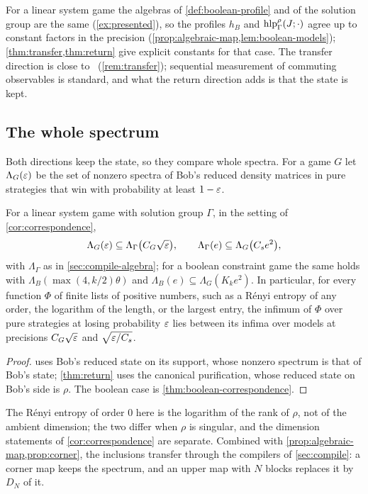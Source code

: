 For a linear system game the algebras of \cref{def:boolean-profile} and of the solution group are the same
(\cref{ex:presented}), so the profiles $h_B$ and $\operatorname{hlp}^\rho_\Gamma(J;\cdot)$ agree up to constant factors in the precision
(\cref{prop:algebraic-map,lem:boolean-models}); \cref{thm:transfer,thm:return} give explicit constants for that case.
The transfer direction is close to~\cite[Proposition~3.13 and Lemma~2.9]{FKMPRSZ25} (\cref{rem:transfer}); sequential
measurement of commuting observables is standard, and what the return direction adds is that the state is kept.

\subsection{The whole spectrum}\label{sec:spectrum}

Both directions keep the state, so they compare whole spectra. For a game $G$ let $\Lambda_G(\varepsilon)$ be the set of nonzero
spectra of Bob's reduced density matrices in pure strategies that win with probability at least $1-\varepsilon$.

\begin{corollary}\label{cor:spectrum}
For a linear system game with solution group $\Gamma$, in the setting of \cref{cor:correspondence},
\[
\Lambda_G(\varepsilon)\subseteq\Lambda_\Gamma\bigl(C_G\sqrt{\varepsilon}\bigr),\qquad\Lambda_\Gamma(e)\subseteq\Lambda_G\bigl(C_se^2\bigr),
\]
with $\Lambda_\Gamma$ as in \cref{sec:compile-algebra}; for a boolean constraint game the same holds with
$\Lambda_B(\max(4,k/2)\theta)$ and $\Lambda_B(e)\subseteq\Lambda_G(K_ke^2)$. In particular, for every function $\Phi$ of finite
lists of positive numbers, such as a Rényi entropy of any order, the logarithm of the length, or the largest entry, the
infimum of $\Phi$ over pure strategies at losing probability $\varepsilon$ lies between its infima over models at precisions
$C_G\sqrt{\varepsilon}$ and $\sqrt{\varepsilon/C_s}$.
\end{corollary}

\begin{proof}
 uses Bob's reduced state on its support, whose nonzero spectrum is that of Bob's state; \cref{thm:return}
uses the canonical purification, whose reduced state on Bob's side is $\rho$. The boolean case is
\cref{thm:boolean-correspondence}.
\end{proof}

The Rényi entropy of order $0$ here is the logarithm of the rank of $\rho$, not of the ambient dimension; the two differ when
$\rho$ is singular, and the dimension statements of \cref{cor:correspondence} are separate. Combined with
\cref{prop:algebraic-map,prop:corner}, the inclusions transfer through the compilers of \cref{sec:compile}: a corner map keeps
the spectrum, and an upper map with $N$ blocks replaces it by $D_N$ of it.

